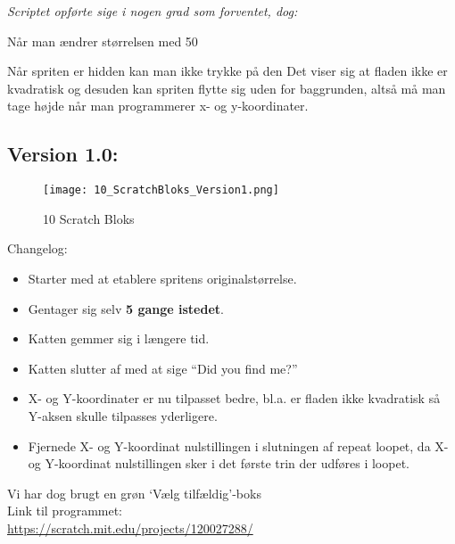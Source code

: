 \textit{Scriptet opførte sige i nogen grad som forventet, dog:}

Når man ændrer størrelsen med 50%

Når spriten er hidden kan man ikke trykke på den
Det viser sig at fladen ikke er kvadratisk og desuden kan spriten flytte sig uden for baggrunden, altså må man tage højde når man programmerer x- og y-koordinater.

\subsection{Version 1.0:}

\begin{figure}[ht]
	\centering
	\texttt{[image: 10\_ScratchBloks\_Version1.png]}
	\caption{{10 Scratch Bloks}}
	\label{fig:Version_1.0}
\end{figure}

Changelog:    

\begin{itemize}
	\item Starter med at etablere spritens originalstørrelse.
	\item Gentager sig selv \textbf{5 gange istedet}.
	\item Katten gemmer sig i længere tid.
	\item Katten slutter af med at sige “Did you find me?”
	\item X- og Y-koordinater er nu tilpasset bedre, bl.a. er fladen ikke kvadratisk så Y-aksen skulle tilpasses yderligere.
	\item Fjernede X- og Y-koordinat nulstillingen i slutningen af repeat loopet, da X- og Y-koordinat nulstillingen sker i det første trin der udføres i loopet. 
\end{itemize}


Vi har dog brugt en grøn ‘Vælg tilfældig’-boks\\

Link til programmet: \\
\url{https://scratch.mit.edu/projects/120027288/}



